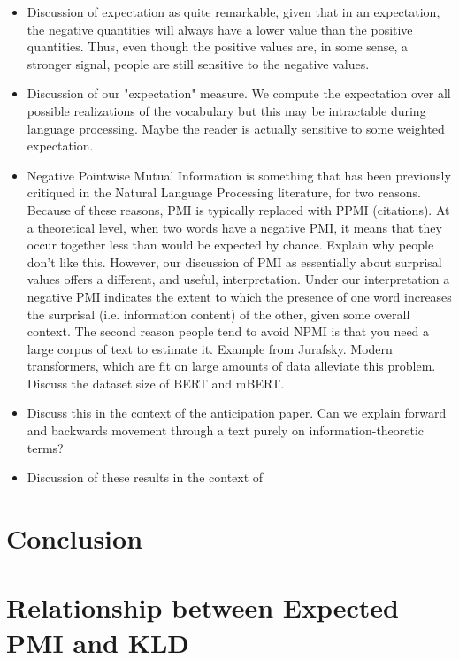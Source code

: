 \documentclass[12pt]{article}
\begin{document}
\begin{itemize}
    \item Discussion of expectation as quite remarkable, given that in an expectation, the negative quantities will always have a lower value than the positive quantities. Thus, even though the positive values are, in some sense, a stronger signal, people are still sensitive to the negative values.
    \item Discussion of our "expectation" measure. We compute the expectation over all possible realizations of the vocabulary but this may be intractable during language processing. Maybe the reader is actually sensitive to some weighted expectation.
    \item Negative Pointwise Mutual Information is something that has been previously critiqued in the Natural Language Processing literature, for two reasons. Because of these reasons, PMI is typically replaced with PPMI (citations). At a theoretical level, when two words have a negative PMI, it means that they occur together less than would be expected by chance. Explain why people don’t like this. However, our discussion of PMI as essentially about surprisal values offers a different, and useful, interpretation. Under our interpretation a negative PMI indicates the extent to which the presence of one word increases the surprisal (i.e. information content) of the other, given some overall context. The second reason people tend to avoid NPMI is that you need a large corpus of text to estimate it. Example from Jurafsky. Modern transformers, which are fit on large amounts of data alleviate this problem. Discuss the dataset size of BERT and mBERT.
    \item Discuss this in the context of the anticipation paper. Can we explain forward and backwards movement through a text purely on information-theoretic terms?
    \item Discussion of these results in the context of \cite{futrell2019information}
\end{itemize}


\section{Conclusion}






\appendix


\section{Relationship between Expected PMI and KLD} \label{app:kld}
\end{document}
